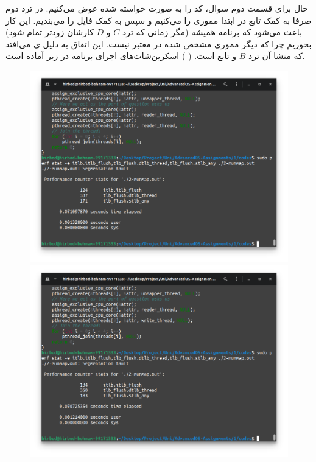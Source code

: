 حال برای قسمت دوم سوال، کد را به صورت خواسته شده عوض می‌کنیم. در ترد دوم صرفا به کمک تابع
در ابتدا مموری را
می‌کنیم و سپس به کمک
فایل را می‌بندیم. این کار باعث می‌شود که برنامه همیشه
(مگر زمانی که ترد $C$ و $D$ کارشان زودتر تمام شود)
بخوریم چرا که دیگر مموری مشخص شده در
معتبر نیست. این اتفاق به دلیل
ی
می‌افتد که منشا آن ترد
$B$
و تابع
است.
(
)
اسکرین‌شات‌‌های اجرای برنامه در زیر آماده است.
\begin{figure}[H]
    \centering
    \includegraphics[scale=0.4]{pics/2-unmap-read-read.png}
    \includegraphics[scale=0.4]{pics/2-unmap-read-write.png}
\end{figure}
